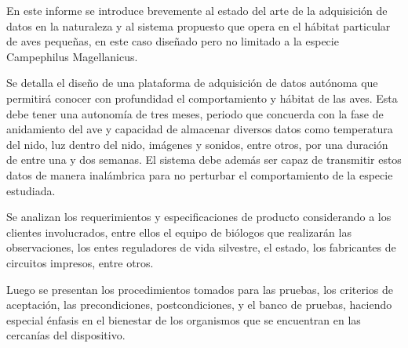 %

%


En este informe se introduce brevemente al estado del arte de la adquisición de datos en la naturaleza y al sistema propuesto que opera en el hábitat particular de aves pequeñas, en este caso diseñado pero no limitado a la especie Campephilus Magellanicus. 

Se detalla el diseño de una plataforma de adquisición de datos autónoma que permitirá conocer con profundidad el comportamiento y hábitat de las aves. Esta debe tener una autonomía de tres meses, periodo que concuerda con la fase de anidamiento del ave y capacidad de almacenar diversos datos como temperatura del nido, luz dentro del nido, imágenes y sonidos, entre otros, por una duración de entre una y dos semanas. El sistema debe además ser capaz de transmitir estos datos de manera inalámbrica para no perturbar el comportamiento de la especie estudiada.

Se analizan los requerimientos y especificaciones de producto considerando a los clientes involucrados, entre ellos el equipo de biólogos que realizarán las observaciones, los entes reguladores de vida silvestre, el estado, los fabricantes de circuitos impresos, entre otros.

Luego se presentan los procedimientos tomados para las pruebas, los criterios de aceptación, las precondiciones, postcondiciones, y el banco de pruebas, haciendo especial énfasis en el bienestar de los organismos que se encuentran en las cercanías del dispositivo.



%